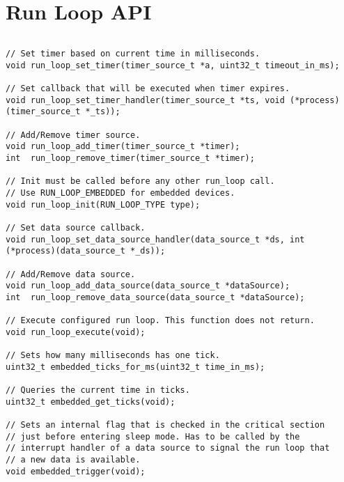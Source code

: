 \section{Run Loop API}
\label{appendix:api_run_loop}
$ $
\begin{lstlisting}
// Set timer based on current time in milliseconds.
void run_loop_set_timer(timer_source_t *a, uint32_t timeout_in_ms);

// Set callback that will be executed when timer expires.
void run_loop_set_timer_handler(timer_source_t *ts, void (*process)(timer_source_t *_ts));

// Add/Remove timer source.
void run_loop_add_timer(timer_source_t *timer); 
int  run_loop_remove_timer(timer_source_t *timer);

// Init must be called before any other run_loop call. 
// Use RUN_LOOP_EMBEDDED for embedded devices.
void run_loop_init(RUN_LOOP_TYPE type);

// Set data source callback.
void run_loop_set_data_source_handler(data_source_t *ds, int (*process)(data_source_t *_ds));

// Add/Remove data source.
void run_loop_add_data_source(data_source_t *dataSource);
int  run_loop_remove_data_source(data_source_t *dataSource);

// Execute configured run loop. This function does not return.
void run_loop_execute(void);

// Sets how many milliseconds has one tick.
uint32_t embedded_ticks_for_ms(uint32_t time_in_ms);

// Queries the current time in ticks.
uint32_t embedded_get_ticks(void);

// Sets an internal flag that is checked in the critical section
// just before entering sleep mode. Has to be called by the 
// interrupt handler of a data source to signal the run loop that  
// a new data is available.
void embedded_trigger(void);
\end{lstlisting}
\pagebreak